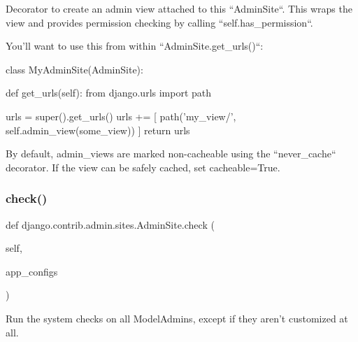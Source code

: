 \begin{DoxyVerb}Decorator to create an admin view attached to this ``AdminSite``. This
wraps the view and provides permission checking by calling
``self.has_permission``.

You'll want to use this from within ``AdminSite.get_urls()``:

    class MyAdminSite(AdminSite):

def get_urls(self):
    from django.urls import path

    urls = super().get_urls()
    urls += [
        path('my_view/', self.admin_view(some_view))
    ]
    return urls

By default, admin_views are marked non-cacheable using the
``never_cache`` decorator. If the view can be safely cached, set
cacheable=True.
\end{DoxyVerb}
 \mbox{\label{classdjango_1_1contrib_1_1admin_1_1sites_1_1_admin_site_af03dc13f2db71bb48df03e7fd721dfe6}} 
\subsubsection{\texorpdfstring{check()}{check()}}
{\footnotesize\ttfamily def django.\+contrib.\+admin.\+sites.\+Admin\+Site.\+check (\begin{DoxyParamCaption}\item[{}]{self,  }\item[{}]{app\+\_\+configs }\end{DoxyParamCaption})}

\begin{DoxyVerb}Run the system checks on all ModelAdmins, except if they aren't
customized at all.
\end{DoxyVerb}
 \mbox{\label{classdjango_1_1contrib_1_1admin_1_1sites_1_1_admin_site_a4d7a09e82e7ec64e422883450e5a8584}} 
